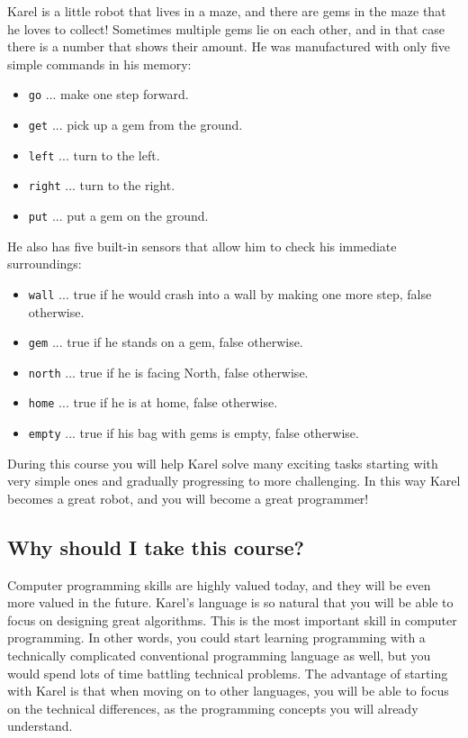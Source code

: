 \documentclass[article,A4,12pt]{llncs}
\begin{document}
Karel is a little robot that lives in a maze, and there are gems in the maze that he loves to collect!
Sometimes multiple gems lie on each other, and in that case there is a number that shows their amount.
He was manufactured with only five simple commands in his memory:
\begin{itemize}
\item {\color{green} \tt go} ... make one step forward.
\item {\color{green} \tt get} ... pick up a gem from the ground. 
\item {\color{green} \tt left} ... turn to the left.
\item {\color{green} \tt right} ... turn to the right. 
\item {\color{green} \tt put} ... put a gem on the ground. 
\end{itemize}
He also has five built-in sensors that allow him to check his immediate surroundings:
\begin{itemize}
\item {\color{green} \tt wall} ... true if he would crash into a wall by making one more step, false otherwise. 
\item {\color{green} \tt gem} ... true if he stands on a gem, false otherwise.
\item {\color{green} \tt north} ... true if he is facing North, false otherwise.
\item {\color{green} \tt home} ... true if he is at home, false otherwise.
\item {\color{green} \tt empty} ... true if his bag with gems is empty, false otherwise. 
\end{itemize}
During this course you will help Karel solve many exciting tasks starting with very simple ones and 
gradually progressing to more challenging. In this way Karel becomes a great robot, and you 
will become a great programmer!

\subsection{Why should I take this course?}

Computer programming skills are highly valued today, and they will be even more 
valued in the future. Karel's language is so natural that you will be able to 
focus on designing great algorithms. This is the most important skill in 
computer programming. In other words, you could start learning programming 
with a technically 
complicated conventional programming language as well, but you would spend lots of time 
battling technical problems. The advantage of starting with Karel is that 
when moving on to other languages, you will be able to focus on the technical 
differences, as the programming concepts you will already understand.
\end{document}
